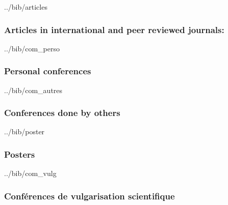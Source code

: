 \documentclass[11pt]{artuppax}
\newcounter{subsec}[section]
\begin{document}
\begin{btSect}{../bib/articles}
    \subsubsection{Articles in international and peer reviewed journals:}
    \smallskip
    \btPrintAll
\end{btSect}

\begin{btSect}{../bib/com_perso}
    \subsubsection{Personal conferences}
    \smallskip
    \btPrintAll
\end{btSect}

\begin{btSect}{../bib/com_autres}
    \subsubsection{Conferences done by others}
    \smallskip
    \btPrintAll
\end{btSect}

\begin{btSect}{../bib/poster}
    \subsubsection{Posters}
    \smallskip
    \btPrintAll
\end{btSect}

\begin{btSect}{../bib/com_vulg}
    \subsubsection{Conférences de vulgarisation scientifique}
    \smallskip
    \btPrintAll
\end{btSect}



\end{document}
